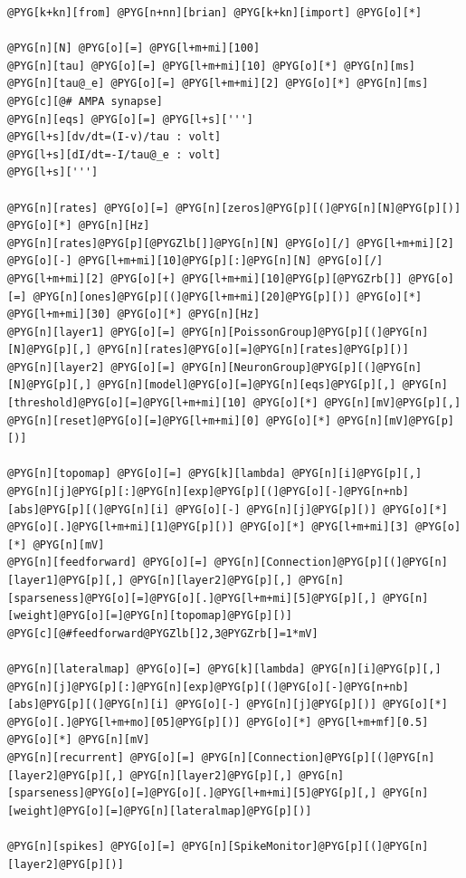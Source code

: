 \documentclass[letterpaper,10pt,english]{manual}
\begin{document}
\begin{Verbatim}[commandchars=@\[\]]
@PYG[k+kn][from] @PYG[n+nn][brian] @PYG[k+kn][import] @PYG[o][*]

@PYG[n][N] @PYG[o][=] @PYG[l+m+mi][100]
@PYG[n][tau] @PYG[o][=] @PYG[l+m+mi][10] @PYG[o][*] @PYG[n][ms]
@PYG[n][tau@_e] @PYG[o][=] @PYG[l+m+mi][2] @PYG[o][*] @PYG[n][ms] @PYG[c][@# AMPA synapse]
@PYG[n][eqs] @PYG[o][=] @PYG[l+s][''']
@PYG[l+s][dv/dt=(I-v)/tau : volt]
@PYG[l+s][dI/dt=-I/tau@_e : volt]
@PYG[l+s][''']

@PYG[n][rates] @PYG[o][=] @PYG[n][zeros]@PYG[p][(]@PYG[n][N]@PYG[p][)] @PYG[o][*] @PYG[n][Hz]
@PYG[n][rates]@PYG[p][@PYGZlb[]]@PYG[n][N] @PYG[o][/] @PYG[l+m+mi][2] @PYG[o][-] @PYG[l+m+mi][10]@PYG[p][:]@PYG[n][N] @PYG[o][/] @PYG[l+m+mi][2] @PYG[o][+] @PYG[l+m+mi][10]@PYG[p][@PYGZrb[]] @PYG[o][=] @PYG[n][ones]@PYG[p][(]@PYG[l+m+mi][20]@PYG[p][)] @PYG[o][*] @PYG[l+m+mi][30] @PYG[o][*] @PYG[n][Hz]
@PYG[n][layer1] @PYG[o][=] @PYG[n][PoissonGroup]@PYG[p][(]@PYG[n][N]@PYG[p][,] @PYG[n][rates]@PYG[o][=]@PYG[n][rates]@PYG[p][)]
@PYG[n][layer2] @PYG[o][=] @PYG[n][NeuronGroup]@PYG[p][(]@PYG[n][N]@PYG[p][,] @PYG[n][model]@PYG[o][=]@PYG[n][eqs]@PYG[p][,] @PYG[n][threshold]@PYG[o][=]@PYG[l+m+mi][10] @PYG[o][*] @PYG[n][mV]@PYG[p][,] @PYG[n][reset]@PYG[o][=]@PYG[l+m+mi][0] @PYG[o][*] @PYG[n][mV]@PYG[p][)]

@PYG[n][topomap] @PYG[o][=] @PYG[k][lambda] @PYG[n][i]@PYG[p][,] @PYG[n][j]@PYG[p][:]@PYG[n][exp]@PYG[p][(]@PYG[o][-]@PYG[n+nb][abs]@PYG[p][(]@PYG[n][i] @PYG[o][-] @PYG[n][j]@PYG[p][)] @PYG[o][*] @PYG[o][.]@PYG[l+m+mi][1]@PYG[p][)] @PYG[o][*] @PYG[l+m+mi][3] @PYG[o][*] @PYG[n][mV]
@PYG[n][feedforward] @PYG[o][=] @PYG[n][Connection]@PYG[p][(]@PYG[n][layer1]@PYG[p][,] @PYG[n][layer2]@PYG[p][,] @PYG[n][sparseness]@PYG[o][=]@PYG[o][.]@PYG[l+m+mi][5]@PYG[p][,] @PYG[n][weight]@PYG[o][=]@PYG[n][topomap]@PYG[p][)]
@PYG[c][@#feedforward@PYGZlb[]2,3@PYGZrb[]=1*mV]

@PYG[n][lateralmap] @PYG[o][=] @PYG[k][lambda] @PYG[n][i]@PYG[p][,] @PYG[n][j]@PYG[p][:]@PYG[n][exp]@PYG[p][(]@PYG[o][-]@PYG[n+nb][abs]@PYG[p][(]@PYG[n][i] @PYG[o][-] @PYG[n][j]@PYG[p][)] @PYG[o][*] @PYG[o][.]@PYG[l+m+mo][05]@PYG[p][)] @PYG[o][*] @PYG[l+m+mf][0.5] @PYG[o][*] @PYG[n][mV]
@PYG[n][recurrent] @PYG[o][=] @PYG[n][Connection]@PYG[p][(]@PYG[n][layer2]@PYG[p][,] @PYG[n][layer2]@PYG[p][,] @PYG[n][sparseness]@PYG[o][=]@PYG[o][.]@PYG[l+m+mi][5]@PYG[p][,] @PYG[n][weight]@PYG[o][=]@PYG[n][lateralmap]@PYG[p][)]

@PYG[n][spikes] @PYG[o][=] @PYG[n][SpikeMonitor]@PYG[p][(]@PYG[n][layer2]@PYG[p][)]


\end{Verbatim}
\end{document}
